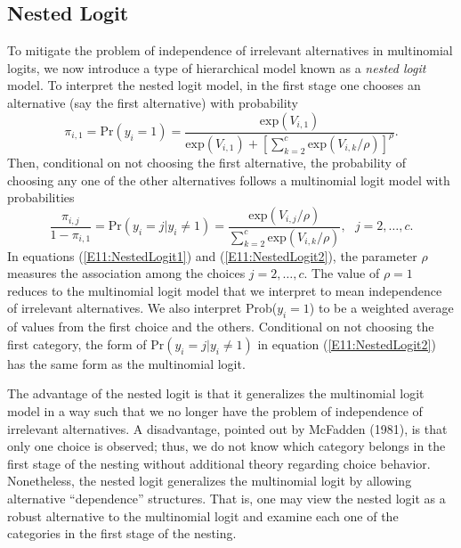 \linejed

\subsection{Nested Logit}\label{S11:NestedLogit}

To mitigate the problem of independence of irrelevant alternatives
in multinomial logits, we now introduce a type of hierarchical model
known as a \emph{nested logit} model. To interpret the nested logit
model, in the first stage one chooses an alternative (say the first
alternative) with probability
\begin{equation}\label{E11:NestedLogit1}
\pi_{i,1} = \mathrm{Pr}(y_i = 1) =
\frac{\mathrm{exp}(V_{i,1})}{\mathrm{exp}(V_{i,1})+ \left[
\sum_{k=2}^c \mathrm{exp}(V_{i,k}/ \rho) \right]^{\rho}}  .
\end{equation}
Then, conditional on not choosing the first alternative, the
probability of choosing any one of the other alternatives follows a
multinomial logit model with probabilities
\begin{equation}\label{E11:NestedLogit2}
\frac{\pi_{i,j}}{1-\pi_{i,1}} = \mathrm{Pr}(y_i = j | y_i \neq 1) =
\frac{\mathrm{exp}(V_{i,j}/ \rho)}{\sum_{k=2}^c
\mathrm{exp}(V_{i,k}/ \rho) }, ~~~j=2, \ldots, c .
\end{equation}
In equations (\ref{E11:NestedLogit1}) and (\ref{E11:NestedLogit2}),
the parameter $\rho$ measures the association among the choices $j =
2, \ldots, c$. The value of $\rho=1$ reduces to the multinomial
logit model that we interpret to mean independence of irrelevant
alternatives. We also interpret Prob($y_i = 1$) to be a weighted
average of values from the first choice and the others. Conditional
on not choosing the first category, the form of $\mathrm{Pr}(y_i = j
| y_i \neq 1)$ in equation (\ref{E11:NestedLogit2}) has the same
form as the multinomial logit.

The advantage of the nested logit is that it generalizes the
multinomial logit model in a way such that we no longer have the
problem of independence of irrelevant alternatives. A disadvantage,
pointed out by McFadden (1981), is that only one choice is observed;
thus, we do not know which category belongs in the first stage of
the nesting without additional theory regarding choice behavior.
Nonetheless, the nested logit generalizes the multinomial logit by
allowing alternative ``dependence'' structures. That is, one may
view the nested logit as a robust alternative to the multinomial
logit and examine each one of the categories in the first stage of
the nesting.

